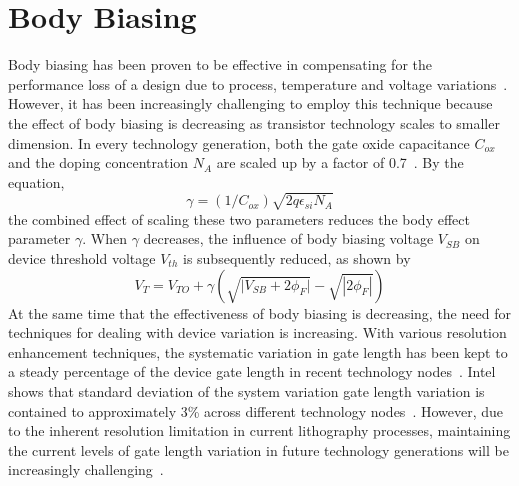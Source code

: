 \section{Body Biasing}
\label{sec:bodybiasing}

Body biasing has been proven to be effective in compensating for the performance loss of a design due to process, temperature and voltage variations~\cite{BodyBiasing}.
However, it has been increasingly challenging to employ this technique because the effect of body biasing is decreasing as transistor technology scales to smaller dimension.
In every technology generation, both the gate oxide capacitance $C_{ox}$ and the doping concentration $N_A$ are scaled up by a factor of 0.7~\cite{Denard}.
By the equation,
\begin{equation}
\gamma = (1/C_{ox})\sqrt{2q\epsilon_{si}N_A}
\end{equation}
the combined effect of scaling these two parameters reduces the body effect parameter $\gamma$.
When $\gamma$ decreases, the influence of body biasing voltage $V_{SB}$ on device threshold voltage $V_{th}$ is subsequently reduced, as shown by
\begin{equation}
V_{T} = V_{TO} + \gamma ( \sqrt{ | {V_{SB} + 2\phi_{F} | } } - \sqrt{ | 2\phi_{F} | } )
\end{equation}
At the same time that the effectiveness of body biasing is decreasing, the need for techniques for dealing with device variation is increasing.
With various resolution enhancement techniques, the systematic variation in gate length has been kept to a steady percentage of the device gate length in recent technology nodes~\cite{Intel:2009}.
Intel shows that standard deviation of the system variation gate length variation is contained to approximately 3\% across different technology nodes~\cite{Intel:2009}.
However, due to the inherent resolution limitation in current lithography processes, maintaining the current levels of gate length variation in future technology generations will be increasingly challenging~\cite{OPC20}.
   
